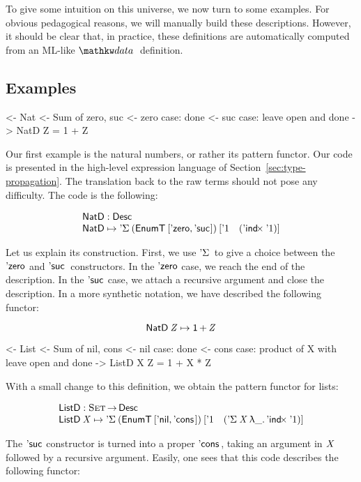 To give some intuition on this universe, we now turn to some
examples. For obvious pedagogical reasons, we will manually build
these descriptions. However, it should be clear that, in practice,
these definitions are automatically computed from an ML-like $\data$
definition.

\subsection{Examples}
\label{sec:desc-examples}

\begin{wstructure}
<- Nat
    <- Sum of zero, suc
    <- zero case: done
    <- suc case: leave open and done
    -> NatD Z = 1 + Z
\end{wstructure}

Our first example is the natural numbers, or rather its pattern
functor. Our code is presented in the high-level expression language
of Section~\ref{sec:type-propagation}. The translation back to the raw
terms should not pose any difficulty. The code is the following:

\[\stk{
\NatD : \Desc \\
\NatD \mapsto \DSigma{(\EnumT{[ \NatZero, \NatSuc{\!} ]})}
                     {[ \DUnit \quad (\DIndx{\DUnit}) ]}
}\]

Let us explain its construction. First, we use $\DSigma{\!}{\!}$ to
give a choice between the $\NatZero$ and $\NatSuc{}$ constructors. In
the $\NatZero$ case, we reach the end of the description. In the
$\NatSuc{\!}$ case, we attach a recursive argument and close the
description. In a more synthetic notation, we have described the
following functor:

\[    \NatD\: \V{Z} \mapsto \Unit \mathop{\D{+}} \V{Z}    \]

\begin{wstructure}
<- List
    <- Sum of nil, cons
    <- nil case: done
    <- cons case: product of X with leave open and done
    -> ListD X Z = 1 + X * Z
\end{wstructure}

With a small change to this definition, we obtain the pattern functor
for lists:

\[\stk{
\ListD : \Set \To \Desc \\
\ListD \: \V{X} \mapsto \DSigma{(\EnumT{[ \ListNil, \ListCons{\!}{\!} ]})}
                           {[ \DUnit \quad (\DSigma{\V{X}}{\LAM{\_} \DIndx{\DUnit}}) ]}
}\]


The $\NatSuc{\!}$ constructor is turned into a proper
$\ListCons{\!}{\!}$, taking an argument in $\V{X}$ followed by a
recursive argument. Easily, one sees that this code describes the
following functor:

